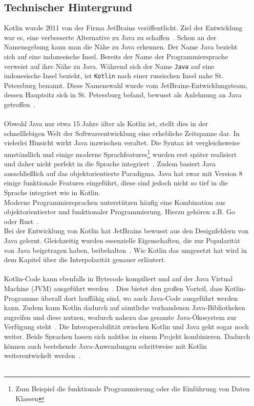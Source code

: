 \documentclass[11pt]{article}
\begin{document}
    \subsection{Technischer Hintergrund}
    Kotlin wurde 2011 von der Firma JetBrains veröffentlicht.
    Ziel der Entwicklung war es, eine verbesserte Alternative zu Java zu schaffen~\cite[19]{kotlin-handbuch}.
    Schon an der Namensgebung kann man die Nähe zu Java erkennen.
    Der Name Java bezieht sich auf eine indonesische Insel.
    Bereits der Name der Programmiersprache verweist auf ihre Nähe zu Java.
    Während sich der Name \texttt{Java} auf eine indonesische Insel bezieht, ist \texttt{Kotlin} nach einer russischen Insel nahe St. Petersburg benannt.
    Diese Namenswahl wurde vom JetBrains-Entwicklungsteam, dessen Hauptsitz sich in St. Petersburg befand, bewusst als Anlehnung an Java getroffen~\cite[19]{kotlin-handbuch}.\\
    \\
    Obwohl Java nur etwa 15 Jahre älter als Kotlin ist, stellt dies in der schnelllebigen Welt der Softwareentwicklung eine erhebliche Zeitspanne dar.
    In vielerlei Hinsicht wirkt Java inzwischen veraltet.
    Die Syntax ist vergleichsweise umständlich und einige moderne Sprachfeatures\footnote{Zum Beispiel die funktionale Programmierung oder die Einführung von Daten Klassen} wurden erst später realisiert und daher nicht perfekt in die Sprache integriert~\cite[19]{kotlin-handbuch}.
    Zudem basiert Java ausschließlich auf das objektorientierte Paradigma.
    Java hat zwar mit Version 8 einige funktionale Features eingeführt, diese sind jedoch nicht so tief in die Sprache integriert wie in Kotlin.\\
    Moderne Programmiersprachen unterstützen häufig eine Kombination aus objektorientierter und funktionaler Programmierung.
    Hierzu gehören z.B. Go~\cite[34]{go} oder Rust~\cite[105]{rust}.
    \\
    Bei der Entwicklung von Kotlin hat JetBrains bewusst aus den Designfehlern von Java gelernt.
    Gleichzeitig wurden essenzielle Eigenschaften, die zur Popularität von Java beigetragen haben, beibehalten~\cite[20]{kotlin-handbuch}.
    Wie Kotlin das umgesetzt hat wird in dem Kapitel über die Interpolarität genauer erläutert.\\
    \\
    Kotlin-Code kann ebenfalls in Bytecode kompiliert und auf der Java Virtual Machine (JVM) ausgeführt werden~\cite{kotlin-compile}.
    Dies bietet den großen Vorteil, dass Kotlin-Programme überall dort lauffähig sind, wo auch Java-Code ausgeführt werden kann.
    Zudem kann Kotlin dadurch auf sämtliche vorhandenen Java-Bibliotheken zugreifen und diese nutzen, wodurch nahezu das gesamte Java-Ökosystem zur Verfügung steht~\cite[20]{kotlin-handbuch}.
    Die Interoperabilität zwischen Kotlin und Java geht sogar noch weiter.
    Beide Sprachen lassen sich nahtlos in einem Projekt kombinieren.
    Dadurch können auch bestehende Java-Anwendungen schrittweise mit Kotlin weiterentwickelt werden~\cite[19-20]{kotlin-handbuch}.\\
    \\
\end{document}
